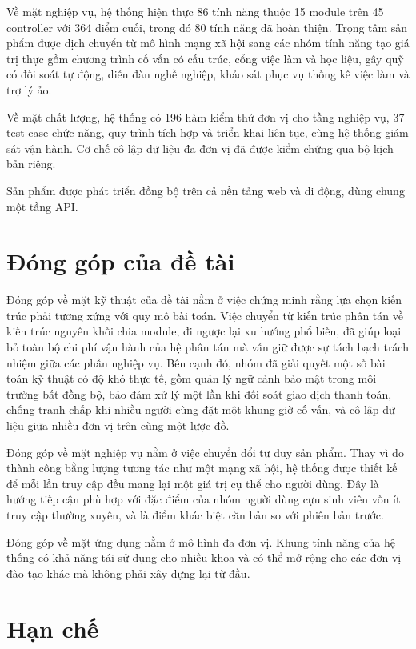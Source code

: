\documentclass[12pt,a4paper,oneside]{report}
\begin{document}
Về mặt nghiệp vụ, hệ thống hiện thực 86 tính năng thuộc 15 module trên 45 controller với 364 điểm cuối, trong đó 80 tính năng đã hoàn thiện. Trọng tâm sản phẩm được dịch chuyển từ mô hình mạng xã hội sang các nhóm tính năng tạo giá trị thực gồm chương trình cố vấn có cấu trúc, cổng việc làm và học liệu, gây quỹ có đối soát tự động, diễn đàn nghề nghiệp, khảo sát phục vụ thống kê việc làm và trợ lý ảo.

Về mặt chất lượng, hệ thống có 196 hàm kiểm thử đơn vị cho tầng nghiệp vụ, 37 test case chức năng, quy trình tích hợp và triển khai liên tục, cùng hệ thống giám sát vận hành. Cơ chế cô lập dữ liệu đa đơn vị đã được kiểm chứng qua bộ kịch bản riêng.

Sản phẩm được phát triển đồng bộ trên cả nền tảng web và di động, dùng chung một tầng API.

\section{Đóng góp của đề tài}

Đóng góp về mặt kỹ thuật của đề tài nằm ở việc chứng minh rằng lựa chọn kiến trúc phải tương xứng với quy mô bài toán. Việc chuyển từ kiến trúc phân tán về kiến trúc nguyên khối chia module, đi ngược lại xu hướng phổ biến, đã giúp loại bỏ toàn bộ chi phí vận hành của hệ phân tán mà vẫn giữ được sự tách bạch trách nhiệm giữa các phần nghiệp vụ. Bên cạnh đó, nhóm đã giải quyết một số bài toán kỹ thuật có độ khó thực tế, gồm quản lý ngữ cảnh bảo mật trong môi trường bất đồng bộ, bảo đảm xử lý một lần khi đối soát giao dịch thanh toán, chống tranh chấp khi nhiều người cùng đặt một khung giờ cố vấn, và cô lập dữ liệu giữa nhiều đơn vị trên cùng một lược đồ.

Đóng góp về mặt nghiệp vụ nằm ở việc chuyển đổi tư duy sản phẩm. Thay vì đo thành công bằng lượng tương tác như một mạng xã hội, hệ thống được thiết kế để mỗi lần truy cập đều mang lại một giá trị cụ thể cho người dùng. Đây là hướng tiếp cận phù hợp với đặc điểm của nhóm người dùng cựu sinh viên vốn ít truy cập thường xuyên, và là điểm khác biệt căn bản so với phiên bản trước.

Đóng góp về mặt ứng dụng nằm ở mô hình đa đơn vị. Khung tính năng của hệ thống có khả năng tái sử dụng cho nhiều khoa và có thể mở rộng cho các đơn vị đào tạo khác mà không phải xây dựng lại từ đầu.

\section{Hạn chế}
\end{document}
